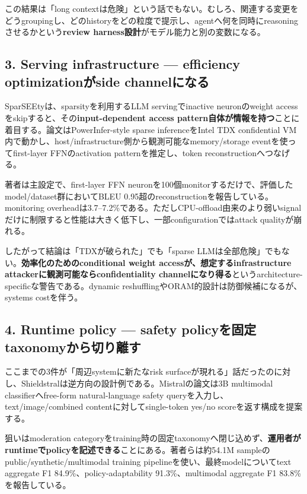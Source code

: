 この結果は「long contextは危険」という話でもない。むしろ、関連する変更をどうgroupingし、どのhistoryをどの粒度で提示し、agentへ何を同時にreasoningさせるかという\textbf{review harness設計}がモデル能力と別の変数になる。

\subsection*{3. Serving infrastructure --- efficiency optimizationがside channelになる}

SparSEEtyは、sparsityを利用するLLM servingでinactive neuronのweight accessをskipすると、その\textbf{input-dependent access pattern自体が情報を持つ}ことに着目する\cite{sparseety-paper}。論文はPowerInfer-style sparse inferenceをIntel TDX confidential VM内で動かし、host/infrastructure側から観測可能なmemory/storage eventを使ってfirst-layer FFNのactivation patternを推定し、token reconstructionへつなげる。

著者は主設定で、first-layer FFN neuronを100個monitorするだけで、評価したmodel/dataset群においてBLEU 0.95超のreconstructionを報告している。monitoring overheadは3.7--7.2\%である。ただしCPU-offload由来のより弱いsignalだけに制限すると性能は大きく低下し、一部configurationではattack qualityが崩れる\cite{sparseety-paper}。

したがって結論は「TDXが破られた」でも「sparse LLMは全部危険」でもない。\textbf{効率化のためのconditional weight accessが、想定するinfrastructure attackerに観測可能ならconfidentiality channelになり得る}というarchitecture-specificな警告である。dynamic reshufflingやORAM的設計は防御候補になるが、systems costを伴う。

\subsection*{4. Runtime policy --- safety policyを固定taxonomyから切り離す}

ここまでの3件が「周辺systemに新たなrisk surfaceが現れる」話だったのに対し、Shieldstralは逆方向の設計例である。Mistralの論文は3B multimodal classifierへfree-form natural-language safety queryを入力し、text/image/combined contentに対してsingle-token yes/no scoreを返す構成を提案する\cite{shieldstral-paper}。

狙いはmoderation categoryをtraining時の固定taxonomyへ閉じ込めず、\textbf{運用者がruntimeでpolicyを記述できる}ことにある。著者らは約54.1M sampleのpublic/synthetic/multimodal training pipelineを使い、最終modelについてtext aggregate F1 84.9\%、policy-adaptability 91.3\%、multimodal aggregate F1 83.8\%を報告している\cite{shieldstral-paper}。

